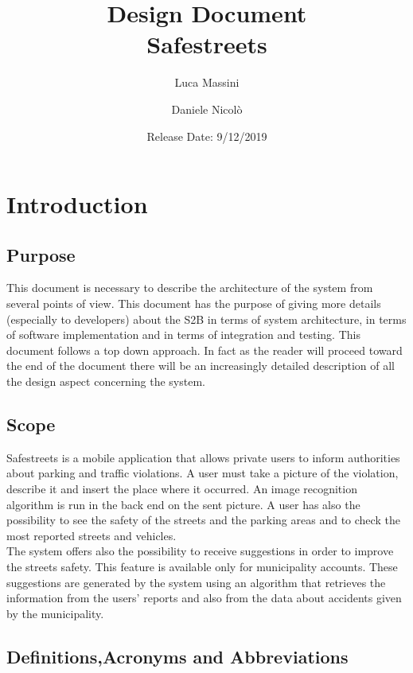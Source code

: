 \documentclass[titlepage]{article}
\author{Luca Massini \and Daniele Nicolò}
\title{Design Document
\\  Safestreets}
\date{Release Date: 9/12/2019}
\begin{document}
\maketitle
\newpage 
\tableofcontents
\newpage
\section{Introduction}
\subsection{Purpose}
	This document is necessary to describe the architecture of the system from several points of view. This document has the purpose of giving more details (especially to developers) about the S2B in terms of system architecture, in terms of software implementation and in terms of integration and testing. This document follows a top down approach. In fact as the reader will proceed toward the end of the document there will be an increasingly detailed description of all the design aspect concerning the system.
\subsection{Scope}
Safestreets is a mobile application that allows private users to inform authorities about parking and traffic violations. A user must take a picture of the violation, describe it and  insert the place where it occurred. An image recognition algorithm is run in the  back end on the sent picture. A user has also the possibility to see the safety of the streets and the parking areas and to check the most reported streets and vehicles. \\
The system offers also the possibility to receive suggestions in order to improve the streets safety. This feature is available only for municipality accounts. These  suggestions are generated by the system using an algorithm that retrieves the information from the users' reports and also from the data about accidents given by the municipality.
\subsection{Definitions,Acronyms and Abbreviations}
\end{document}
